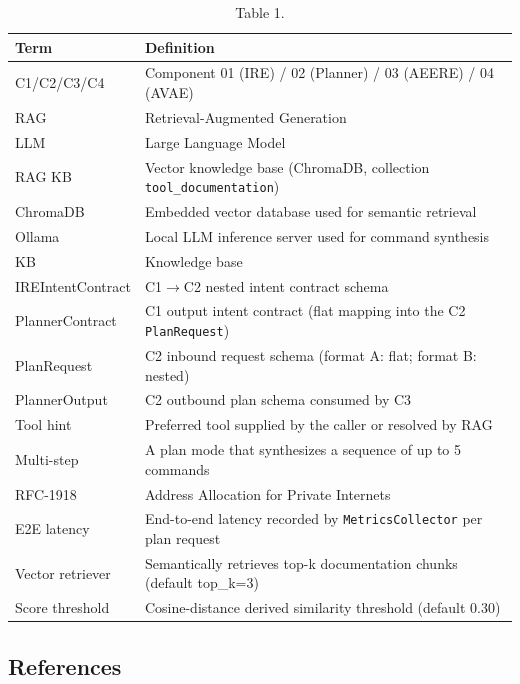 \documentclass[10pt,journal,onecolumn]{IEEEtran}
\begin{document}
\begin{table}[h]
\caption{Table 1.}
\label{tab:t1}
\begin{tabularx}{\columnwidth}{l >{\raggedright\arraybackslash}X}
\toprule
\textbf{Term} & \textbf{Definition}\\
\midrule
C1/C2/C3/C4 & Component 01 (IRE) / 02 (Planner) / 03 (AEERE) / 04 (AVAE)\\
RAG & Retrieval-Augmented Generation\\
LLM & Large Language Model\\
RAG KB & Vector knowledge base (ChromaDB, collection \texttt{tool\_documentation})\\
ChromaDB & Embedded vector database used for semantic retrieval\\
Ollama & Local LLM inference server used for command synthesis\\
KB & Knowledge base\\
IREIntentContract & C1$\rightarrow$C2 nested intent contract schema\\
PlannerContract & C1 output intent contract (flat mapping into the C2 \texttt{PlanRequest})\\
PlanRequest & C2 inbound request schema (format A: flat; format B: nested)\\
PlannerOutput & C2 outbound plan schema consumed by C3\\
Tool hint & Preferred tool supplied by the caller or resolved by RAG\\
Multi-step & A plan mode that synthesizes a sequence of up to 5 commands\\
RFC-1918 & Address Allocation for Private Internets\\
E2E latency & End-to-end latency recorded by \texttt{MetricsCollector} per plan request\\
Vector retriever & Semantically retrieves top-k documentation chunks (default top\_k=3)\\
Score threshold & Cosine-distance derived similarity threshold (default 0.30)\\
\bottomrule
\end{tabularx}
\end{table}

\subsection{References}
\end{document}
